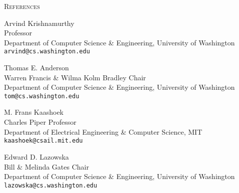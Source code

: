 \documentclass[10pt,times]{report}
\newlength{\sectiongap}
\newlength{\sectioncolwidth}
\newlength{\colgap}
\newlength{\stuffwidth}
\newenvironment{rtable}{
  \begin{minipage}{\textwidth}
  }{
  \end{minipage}
}
\newenvironment{rsection}[1]{
  \begin{minipage}[t]{\sectioncolwidth}
    \textsc{#1}
  \end{minipage}
  \hspace{\colgap}
  \begin{minipage}[t]{\stuffwidth}
  }{
    \removelastskip
  \end{minipage}
  \\[\sectiongap]
}
\begin{document}
\begin{rtable}
\begin{rsection}{References}
    Arvind Krishnamurthy\\
    Professor\\
    Department of Computer Science \& Engineering, University of Washington\\
    \texttt{arvind@cs.washington.edu}\\
    \vspace{-.5em}
    
    Thomas E. Anderson\\
    Warren Francis \& Wilma Kolm Bradley Chair\\
    Department of Computer Science \& Engineering, University of Washington\\
    \texttt{tom@cs.washington.edu}\\
    \vspace{-.5em}
    
    M. Frans Kaashoek\\
    Charles Piper Professor\\
    Department of Electrical Engineering \& Computer Science, MIT\\
    \texttt{kaashoek@csail.mit.edu}\\
    \vspace{-.5em}
    
    Edward D. Lazowska\\
    Bill \& Melinda Gates Chair\\
    Department of Computer Science \& Engineering, University of Washington\\
    \texttt{lazowska@cs.washington.edu}\\
  \end{rsection}
\end{rtable}
\end{document}
